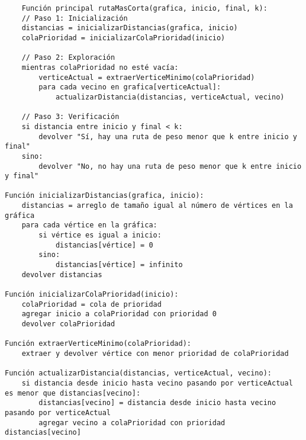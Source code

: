 \begin{verbatim}
    Función principal rutaMasCorta(grafica, inicio, final, k):
    // Paso 1: Inicialización
    distancias = inicializarDistancias(grafica, inicio)
    colaPrioridad = inicializarColaPrioridad(inicio)
    
    // Paso 2: Exploración
    mientras colaPrioridad no esté vacía:
        verticeActual = extraerVerticeMinimo(colaPrioridad)
        para cada vecino en grafica[verticeActual]:
            actualizarDistancia(distancias, verticeActual, vecino)
    
    // Paso 3: Verificación
    si distancia entre inicio y final < k:
        devolver "Sí, hay una ruta de peso menor que k entre inicio y final"
    sino:
        devolver "No, no hay una ruta de peso menor que k entre inicio y final"

Función inicializarDistancias(grafica, inicio):
    distancias = arreglo de tamaño igual al número de vértices en la gráfica
    para cada vértice en la gráfica:
        si vértice es igual a inicio:
            distancias[vértice] = 0
        sino:
            distancias[vértice] = infinito
    devolver distancias

Función inicializarColaPrioridad(inicio):
    colaPrioridad = cola de prioridad
    agregar inicio a colaPrioridad con prioridad 0
    devolver colaPrioridad

Función extraerVerticeMinimo(colaPrioridad):
    extraer y devolver vértice con menor prioridad de colaPrioridad

Función actualizarDistancia(distancias, verticeActual, vecino):
    si distancia desde inicio hasta vecino pasando por verticeActual es menor que distancias[vecino]:
        distancias[vecino] = distancia desde inicio hasta vecino pasando por verticeActual
        agregar vecino a colaPrioridad con prioridad distancias[vecino]

\end{verbatim}
